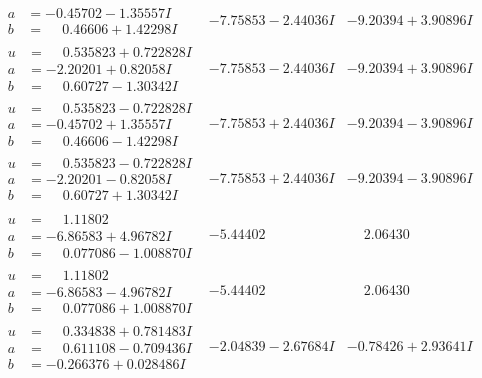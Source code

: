 \documentclass[1p]{elsarticle_modified}
\theoremstyle{definition}
\begin{document}
$$\begin{array}{c|c|c}
\begin{aligned}
a &= -0.45702 - 1.35557 I \\
b &= \phantom{-}0.46606 + 1.42298 I\end{aligned}
 & -7.75853 - 2.44036 I & -9.20394 + 3.90896 I \\ \hline\begin{aligned}
u &= \phantom{-}0.535823 + 0.722828 I \\
a &= -2.20201 + 0.82058 I \\
b &= \phantom{-}0.60727 - 1.30342 I\end{aligned}
 & -7.75853 - 2.44036 I & -9.20394 + 3.90896 I \\ \hline\begin{aligned}
u &= \phantom{-}0.535823 - 0.722828 I \\
a &= -0.45702 + 1.35557 I \\
b &= \phantom{-}0.46606 - 1.42298 I\end{aligned}
 & -7.75853 + 2.44036 I & -9.20394 - 3.90896 I \\ \hline\begin{aligned}
u &= \phantom{-}0.535823 - 0.722828 I \\
a &= -2.20201 - 0.82058 I \\
b &= \phantom{-}0.60727 + 1.30342 I\end{aligned}
 & -7.75853 + 2.44036 I & -9.20394 - 3.90896 I \\ \hline\begin{aligned}
u &= \phantom{-}1.11802\phantom{ +0.000000I} \\
a &= -6.86583 + 4.96782 I \\
b &= \phantom{-}0.077086 - 1.008870 I\end{aligned}
 & -5.44402\phantom{ +0.000000I} & \phantom{-}2.06430\phantom{ +0.000000I} \\ \hline\begin{aligned}
u &= \phantom{-}1.11802\phantom{ +0.000000I} \\
a &= -6.86583 - 4.96782 I \\
b &= \phantom{-}0.077086 + 1.008870 I\end{aligned}
 & -5.44402\phantom{ +0.000000I} & \phantom{-}2.06430\phantom{ +0.000000I} \\ \hline\begin{aligned}
u &= \phantom{-}0.334838 + 0.781483 I \\
a &= \phantom{-}0.611108 - 0.709436 I \\
b &= -0.266376 + 0.028486 I\end{aligned}
 & -2.04839 - 2.67684 I & -0.78426 + 2.93641 I \\ \hline\begin{aligned}

\end{aligned}
\end{array}$$
\end{document}
